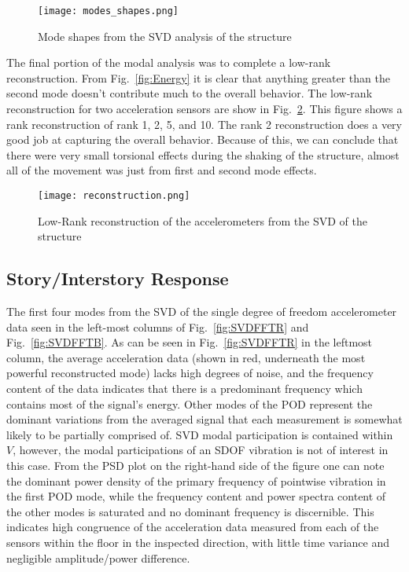 \documentclass{article}
\begin{document}
\medskip

\begin{figure}
    \centering
    \texttt{[image: modes\_shapes.png]}
    \caption{Mode shapes from the SVD analysis of the structure}
    \label{fig:modes_shapes}
\end{figure}
\FloatBarrier

The final portion of the modal analysis was to complete a low-rank reconstruction. From Fig.\ \ref{fig:Energy} it is clear that anything greater than the second mode doesn't contribute much to the overall behavior. The low-rank reconstruction for two acceleration sensors are show in Fig.\ \ref{fig:reconstruction}. This figure shows a rank reconstruction of rank 1, 2, 5, and 10. The rank 2 reconstruction does a very good job at capturing the overall behavior. Because of this, we can conclude that there were very small torsional effects during the shaking of the structure, almost all of the movement was just from first and second mode effects.  

\begin{figure}[h]
    \centering
    \texttt{[image: reconstruction.png]}
    \caption{Low-Rank reconstruction of the accelerometers from the SVD of the structure}
    \label{fig:reconstruction}
\end{figure}

\FloatBarrier
\subsection{Story/Interstory Response}

The first four modes from the SVD of the single degree of freedom accelerometer data seen in the left-most columns of Fig.\  \ref{fig:SVDFFTR} and Fig.\  \ref{fig:SVDFFTB}. 
As can be seen in Fig.\  \ref{fig:SVDFFTR} in the leftmost column, the average acceleration data (shown in red, underneath the most powerful reconstructed mode) lacks high degrees of noise, and the frequency content of the data indicates that there is a predominant frequency which contains most of the signal's energy. Other modes of the POD represent the dominant variations from the averaged signal that each measurement is somewhat likely to be partially comprised of. SVD modal participation is contained within $V$, however, the modal participations of an SDOF vibration is not of interest in this case. From the PSD plot on the right-hand side of the figure one can note the dominant power density of the primary frequency of pointwise vibration in the first POD mode, while the frequency content and power spectra content of the other modes is saturated and no dominant frequency is discernible. This indicates high congruence of the acceleration data measured from each of the sensors within the floor in the inspected direction, with little time variance and negligible amplitude/power difference.
\end{document}
